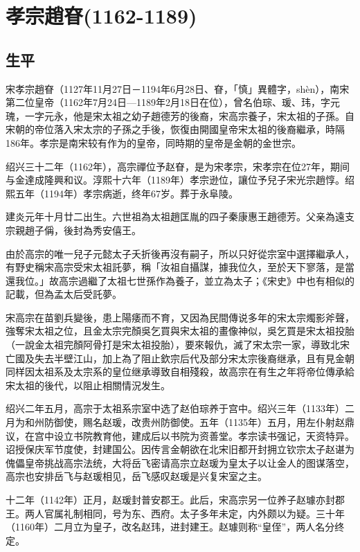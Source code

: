 
\section{孝宗趙眘\tiny(1162-1189)}

\subsection{生平}

宋孝宗趙眘（1127年11月27日－1194年6月28日、眘，「慎」異體字，shèn），南宋第二位皇帝（1162年7月24日—1189年2月18日在位），曾名伯琮、瑗、玮，字元瑰，一字元永，他是宋太祖之幼子趙德芳的後裔，宋高宗養子，宋太祖的子孫。自宋朝的帝位落入宋太宗的子孫之手後，恢復由開國皇帝宋太祖的後裔繼承，時隔186年。孝宗是南宋较有作为的皇帝，同時期的皇帝是金朝的金世宗。

绍兴三十二年（1162年），高宗禪位予赵眘，是为宋孝宗，宋孝宗在位27年，期间与金達成隆興和议。淳熙十六年（1189年）孝宗逊位，讓位予兒子宋光宗趙惇。绍熙五年（1194年）孝宗病逝，终年67岁。葬于永阜陵。

建炎元年十月廿二出生。六世祖為太祖趙匡胤的四子秦康惠王趙德芳。父亲為遠支宗親趙子偁，後封為秀安僖王。

由於高宗的唯一兒子元懿太子夭折後再沒有嗣子，所以只好從宗室中選擇繼承人，有野史稱宋高宗受宋太祖託夢，稱「汝祖自攝謀，據我位久，至於天下寥落，是當還我位。」故高宗過繼了太祖七世孫作為養子，並立為太子；《宋史》中也有相似的記載，但為孟太后受託夢。

宋高宗在苗劉兵變後，患上陽痿而不育，又因為民間傳说多年的宋太宗燭影斧聲，強奪宋太祖之位，且金太宗完顏吳乞買與宋太祖的畫像神似，吳乞買是宋太祖投胎（一說金太祖完顏阿骨打是宋太祖投胎），要來報仇，滅了宋太宗一家，導致北宋亡國及失去半壁江山，加上為了阻止欽宗后代及部分宋太宗後裔继承，且有見金朝同样因太祖系及太宗系的皇位继承導致自相殘殺，故高宗在有生之年将帝位傳承給宋太祖的後代，以阻止相關情況发生。

绍兴二年五月，高宗于太祖系宗室中选了赵伯琮养于宫中。绍兴三年（1133年）二月为和州防御使，赐名赵瑗，改贵州防御使。五年（1135年）五月，用左仆射赵鼎议，在宫中设立书院教育他，建成后以书院为资善堂。孝宗读书强记，天资特异。诏授保庆军节度使，封建国公。因传言金朝欲在北宋旧都开封拥立钦宗太子赵谌为傀儡皇帝挑战高宗法统，大将岳飞密请高宗立赵瑗为皇太子以让金人的图谋落空，高宗也安排岳飞与赵瑗相见，岳飞感叹赵瑗是兴复宋室之主。

十二年（1142年）正月，赵瑗封普安郡王。此后，宋高宗另一位养子赵璩亦封郡王。两人官属礼制相同，号为东、西府。太子多年未定，内外颇以为疑。三十年（1160年）二月立为皇子，改名赵玮，进封建王。赵璩则称“皇侄”，两人名分终定。

